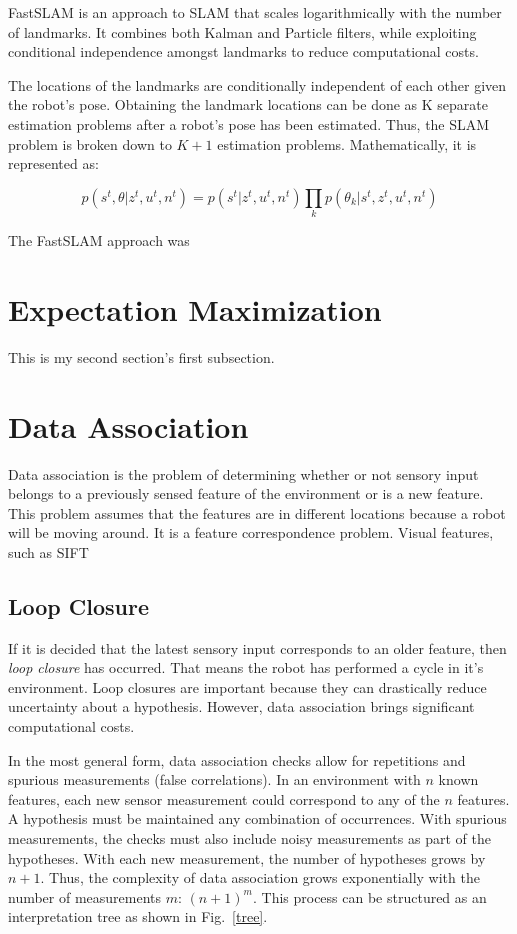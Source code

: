\documentclass[10pt,conference]{ieeeconf}
\begin{document}
	
	FastSLAM \cite{montemerlo2002fastslam} is an approach to SLAM that scales logarithmically with the number of landmarks. It combines both Kalman and Particle filters, while exploiting conditional independence amongst landmarks to reduce computational costs.
	
	The locations of the landmarks are conditionally independent of each other given the robot's pose. Obtaining the landmark locations can be done as K separate estimation problems after a robot's pose has been estimated. Thus, the SLAM problem is broken down to $K+1$ estimation problems. Mathematically, it is represented as:
	
	\begin{equation}
	p(s^t, \theta | z^t, u^t, n^t) = p(s^t | z^t, u^t, n^t) \prod_k p(\theta_k | s^t, z^t, u^t, n^t)
	\end{equation}
	
	The FastSLAM approach was 

\section {Expectation Maximization}
    This is my second section's first subsection.
    
    
\section {Data Association}

	Data association is the problem of determining whether or not sensory input belongs to a previously sensed feature of the environment or is a new feature. This problem assumes that the features are in different locations because a robot will be moving around.
	It is a feature correspondence problem. 
	Visual features, such as SIFT
	
\subsection {Loop Closure}

	If it is decided that the latest sensory input corresponds to an older feature, then \emph{loop closure} has occurred. That means the robot has performed a cycle in it's environment. Loop closures are important because they can drastically reduce uncertainty about a hypothesis. However, data association brings significant computational costs. 
	
	In the most general form, data association checks allow for repetitions and spurious measurements (false correlations). In an environment with $n$ known features, each new sensor measurement could correspond to any of the $n$ features. A hypothesis must be maintained any combination of occurrences. With spurious measurements, the checks must also include noisy measurements as part of the hypotheses. With each new measurement, the number of hypotheses grows by $n+1$. Thus, the complexity of data association grows exponentially with the number of measurements $m$: $(n+1)^m$. This process can be structured as an interpretation tree as shown in Fig.~\ref{tree}.
	
\end{document}
